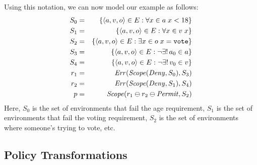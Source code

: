 Using this notation, we can now model our example as follows:
\begin{eqnarray}
  S_0 & = & \{ \langle a, v, o \rangle \in E : \forall x \in a \; x < 18 \} 
  \label{eq:s0} \\
  S_1 & = & \{ \langle a, v, o \rangle \in E : \forall x \in v \; x \}
  \label{eq:s1} \\
  S_2 & = & \{ \langle a, v, o \rangle \in E : 
  \exists x \in o \; x = \text{\texttt{vote}} \} \label{eq:s2} \\
  S_3 & = & \{ \langle a, v, o \rangle \in E : \neg \exists ! \, a_0 \in a \} 
  \label{eq:s3} \\
  S_4 & = & \{ \langle a, v, o \rangle \in E : \neg \exists ! \, v_0 \in v \}
  \label{eq:s4} \\
  r_1 & = & \text{\textit{Err}} (\text{\textit{Scope}} (\text{\textit{Deny}}, S_0), S_3) \label{eq:r1} \\
  r_2 & = & \text{\textit{Err}} (\text{\textit{Scope}} (\text{\textit{Deny}}, S_1), S_4) \label{eq:r2} \\
  p & = & \text{\textit{Scope}} (r_1 \ominus r_2 \ominus \text{\textit{Permit}}, S_2) \label{eq:p}
\end{eqnarray}
Here, $S_0$ is the set of environments that fail the age requirement,
$S_1$ is the set of environments that fail the voting requirement,
$S_2$ is the set of environments where someone's trying to vote, etc.

\subsection{Policy Transformations}
\label{sec:transformations}

